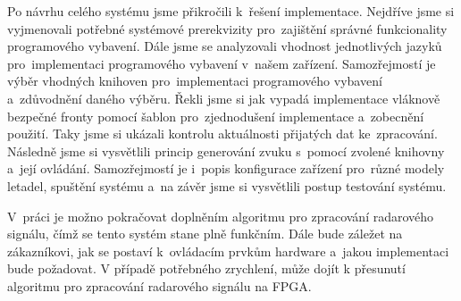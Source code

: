 	Po návrhu celého systému jsme přikročili k~řešení implementace. Nejdříve jsme si vyjmenovali potřebné systémové prerekvizity pro~zajištění správné funkcionality programového vybavení. Dále jsme se analyzovali vhodnost jednotlivých jazyků pro~implementaci programového vybavení v~našem zařízení. Samozřejmostí je výběr vhodných knihoven pro~implementaci programového vybavení a~zdůvodnění daného výběru. Řekli jsme si jak vypadá implementace vláknově bezpečné fronty pomocí šablon pro~zjednodušení implementace a~zobecnění použití. Taky jsme si ukázali kontrolu aktuálnosti přijatých dat ke~zpracování. Následně jsme si vysvětlili princip generování zvuku s~pomocí zvolené knihovny a~její ovládání. Samozřejmostí je i~popis konfigurace zařízení pro~různé modely letadel, spuštění systému a~na závěr jsme si vysvětlili postup testování systému.\par
	V~práci je možno pokračovat doplněním algoritmu pro zpracování radarového signálu, čímž se tento systém stane plně funkčním. Dále bude záležet na zákazníkovi, jak se postaví k~ovládacím prvkům hardware a~jakou implementaci bude požadovat. V případě potřebného zrychlení, může dojít k přesunutí algoritmu pro zpracování radarového signálu na FPGA.
	

